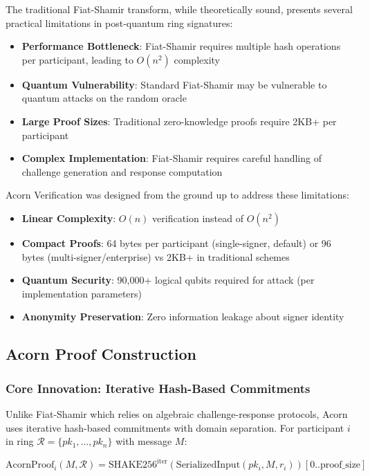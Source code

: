 \documentclass[11pt,a4paper]{article}
\begin{document}
The traditional Fiat-Shamir transform, while theoretically sound, presents several practical limitations in post-quantum ring signatures:

\begin{itemize}
\item \textbf{Performance Bottleneck}: Fiat-Shamir requires multiple hash operations per participant, leading to $O(n^2)$ complexity
\item \textbf{Quantum Vulnerability}: Standard Fiat-Shamir may be vulnerable to quantum attacks on the random oracle
\item \textbf{Large Proof Sizes}: Traditional zero-knowledge proofs require 2KB+ per participant
\item \textbf{Complex Implementation}: Fiat-Shamir requires careful handling of challenge generation and response computation
\end{itemize}

Acorn Verification was designed from the ground up to address these limitations:

\begin{itemize}
\item \textbf{Linear Complexity}: $O(n)$ verification instead of $O(n^2)$
\item \textbf{Compact Proofs}: 64 bytes per participant (single-signer, default) or 96 bytes (multi-signer/enterprise) vs 2KB+ in traditional schemes
\item \textbf{Quantum Security}: 90,000+ logical qubits required for attack (per implementation parameters)
\item \textbf{Anonymity Preservation}: Zero information leakage about signer identity
\end{itemize}

\subsection{Acorn Proof Construction}

\subsubsection{Core Innovation: Iterative Hash-Based Commitments}

Unlike Fiat-Shamir which relies on algebraic challenge-response protocols, Acorn uses iterative hash-based commitments with domain separation. For participant $i$ in ring $\mathcal{R} = \{pk_1, \ldots, pk_n\}$ with message $M$:

\begin{equation}
\text{AcornProof}_i(M, \mathcal{R}) = \text{SHAKE256}^{\text{iter}}(\text{SerializedInput}(pk_i, M, r_i))[0..\text{proof\_size}]
\end{equation}
\end{document}
